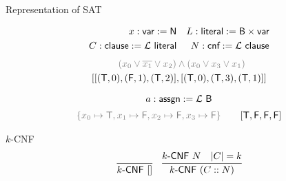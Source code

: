 \documentclass[11pt,usenames,dvipsnames,
  hyperref={pdfencoding=auto,psdextra}]{beamer}
\begin{document}
\begin{frame}
\begin{columns}
\begin{column}{0.3\textwidth}
\begin{center}
{
        }
      \end{center}
    \end{column}
  \end{columns}
\end{frame}

\begin{frame}[allowframebreaks]{Representation of SAT}

\begin{align*}
  x : \textsf{var} := \mathsf{N}&& 
  L : \textsf{literal} := \textsf{B} \times \textsf{var} \\
  C : \textsf{clause} := \mathcal{L}~ \textsf{literal} &&
  N : \textsf{cnf} := \mathcal{L}~ \textsf{clause} 
\end{align*}
\begin{align*}
  \color{gray}(x_0 \lor \overline{x_1} \lor x_2) &\color{gray}\land (x_0 \lor x_3 \lor x_1)\\
  [[(\btrue, 0), (\bfalse, 1), (\btrue, 2)]&, [(\btrue, 0), (\btrue, 3), (\btrue, 1)]]
\end{align*}

\[ a : \textsf{assgn} := \mathcal{L}~ \textsf{B}\]
\begin{align*}   
  {\color{gray}\{x_0 \mapsto \btrue, x_1 \mapsto \bfalse, x_2 \mapsto \bfalse, x_3 \mapsto \bfalse\}}\qquad 
  [\btrue, \bfalse, \bfalse, \bfalse] 
\end{align*}

\pagebreak
\begin{block}{$k$-CNF}
\begin{align*}
\infer{\textsf{$k$-CNF}~[]}{} && \infer{\textsf{$k$-CNF}~(C::N)}{\textsf{$k$-CNF}~N \quad \length{C} = k} 
\end{align*}
\end{block}
\end{frame}
\end{document}
